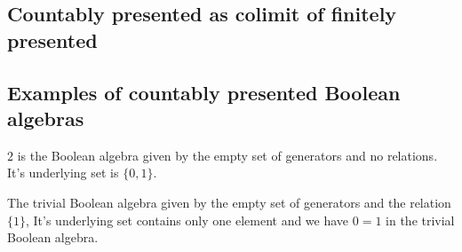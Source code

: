 \documentclass{../util/zariski-small}
\begin{document}
\subsection{Countably presented as colimit of finitely presented}


\subsection{Examples of countably presented Boolean algebras}
\begin{example}
  $2$ is the Boolean algebra given by the empty set of generators and no relations. 
    It's underlying set is $\{0,1\}$. 
\end{example}
\begin{example}
  The trivial Boolean algebra given by the empty set of generators and the relation $\{1\}$, 
  It's underlying set contains only one element and we have $0=1$ in the trivial Boolean algebra. 
\end{example}
\end{document}
